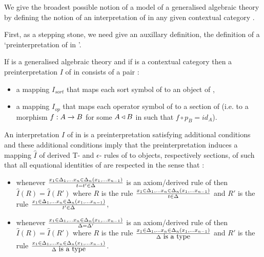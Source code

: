 \note
We give the broadest possible notion of a model
of a generalised algebraic theory \gat[U] by defining the notion of an interpretation of  \gat[U] in  any given contextual category \catc.

\note
First, as a stepping stone, we need  give an auxillary definition, the definition of  a `preinterpretation of \gat[U] in \catc'.

\newcommand{\Isort}{I_{sort}}
\newcommand{\Iop}{I_{op}}
\note 
If \gat[U] is a generalised algebraic theory  and if \catcw is a contextual category then
a preinterpretation $I$ of  \gat[U] in \catcw consists of a pair :
\begin{itemize}
\item a mapping $\Isort$ that maps each sort symbol of \gat[U] to  an object of \catc,
\item a mapping $\Iop$ that maps each operator symbol of \gat[U] to a section of \catcw (i.e. to a morphism $f: A \rightarrow B$ for some 
$A \triangleleft B$ in \catcw such that $f \circ p_B=id_A$).
\end{itemize}

\note 
An interpretation $I$ of \gat[U] in \catcw is a preinterpretation satisfying additional conditions and these 
additional conditions imply that the preinterpretation induces a mapping $\hat{I}$
of derived T- and $\epsilon$- rules of \gat[U] to objects, respectively sections, of \gat[U] such that 
all equational identities of \gat[U] are respected in the sense that :
\begin{itemize}
\item whenever 
$\frac{x_1 \in \Delta_1,... x_{n} \in \Delta_{n}(x_1,...x_{n-1})}{t = t' \in \Delta}$
is an axiom/derived rule of \gat[U] then $\hat{I}(R) = \hat{I}(R')$
where $R$ is the rule
$\frac{x_1 \in \Delta_1,... x_{n} \in \Delta_{n}(x_1,...x_{n-1})}{t \in \Delta}$
and $R'$ is the rule
$\frac{x_1 \in \Delta_1,... x_{n} \in \Delta_{n}(x_1,...x_{n-1})}{t' \in \Delta}$,
\item whenever
$\frac{x_1 \in \Delta_1,... x_{n} \in \Delta_{n}(x_1,...x_{n-1})}{\Delta = \Delta'}$
is an axiom/derived rule of \gat[U] then $\hat{I}(R) = \hat{I}(R')$
where $R$ is the rule
$\frac{x_1 \in \Delta_1,... x_{n} \in \Delta_{n}(x_1,...x_{n-1})}{\Delta\mbox{ is a type}}$
and $R'$ is the rule
$\frac{x_1 \in \Delta_1,... x_{n} \in \Delta_{n}(x_1,...x_{n-1})}{\Delta\mbox{ is a type}}$.
\end{itemize}